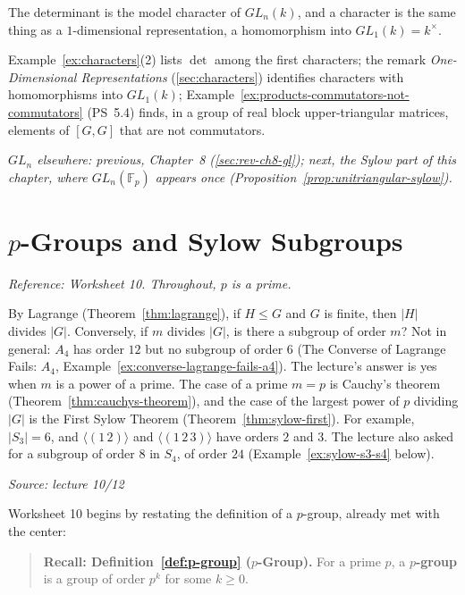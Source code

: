 \documentclass[11pt]{report}
\newcommand{\srcline}[1]{\par\hfill{\footnotesize\textit{Source: #1}}}
\begin{document}
The determinant is the model character of $GL_n(k)$, and a character is the same thing as a $1$-dimensional representation, a homomorphism into $GL_1(k) = k^\times$.

Example~\ref{ex:characters}(2) lists $\det$ among the first characters; the remark \emph{One-Dimensional Representations} (\ref{sec:characters}) identifies characters with homomorphisms into $GL_1(k)$; Example~\ref{ex:products-commutators-not-commutators} (PS~5.4) finds, in a group of real block upper-triangular matrices, elements of $[G, G]$ that are not commutators.

\textit{$GL_n$ elsewhere: previous, Chapter~8 (\ref{sec:rev-ch8-gl}); next, the Sylow part of this chapter, where $GL_n(\mathbb{F}_p)$ appears once (Proposition~\ref{prop:unitriangular-sylow}).}

\section{\texorpdfstring{$p$-Groups and Sylow Subgroups}{p-Groups and Sylow Subgroups}}\label{sec:p-groups}

\textit{Reference: Worksheet 10. Throughout, $p$ is a prime.}

\begin{rembox}\label{rem:sylow-question}
By Lagrange (Theorem~\ref{thm:lagrange}), if $H \leq G$ and $G$ is finite, then $|H|$ divides $|G|$. Conversely, if $m$ divides $|G|$, is there a subgroup of order $m$? Not in general: $A_4$ has order $12$ but no subgroup of order $6$ (The Converse of Lagrange Fails: $A_4$, Example~\ref{ex:converse-lagrange-fails-a4}). The lecture's answer is yes when $m$ is a power of a prime. The case of a prime $m = p$ is Cauchy's theorem (Theorem~\ref{thm:cauchys-theorem}), and the case of the largest power of $p$ dividing $|G|$ is the First Sylow Theorem (Theorem~\ref{thm:sylow-first}). For example, $|S_3| = 6$, and $\langle (1\,2) \rangle$ and $\langle (1\,2\,3) \rangle$ have orders $2$ and $3$. The lecture also asked for a subgroup of order $8$ in $S_4$, of order $24$ (Example~\ref{ex:sylow-s3-s4} below).
\srcline{lecture 10/12}
\end{rembox}

Worksheet 10 begins by restating the definition of a $p$-group, already met with the center:

\begin{quote}
\textbf{Recall: Definition~\ref{def:p-group} ($p$-Group).} For a prime $p$, a \textbf{$p$-group} is a group of order $p^k$ for some $k \geq 0$.
\end{quote}
\end{document}
